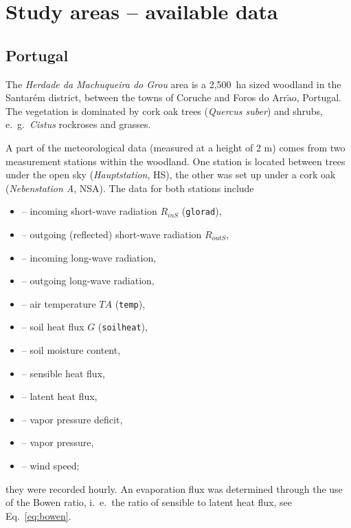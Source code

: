 \documentclass{scrreprt}
\newenvironment{denseitem}{
  \begin{itemize}
    \setlength{\itemsep}{0pt}
    \setlength{\parskip}{0pt}
    \setlength{\parsep}{0pt}
}{
  \end{itemize}
}
\begin{document}
\newpage
\section{Study areas -- available data} \label{sec:intro_areas}

\subsection{Portugal} \label{ssec:intro_areas_portugal}

The \emph{Herdade da Machuqueira do Grou} area is a 2,500~ha sized woodland in the Santar\'em district, between the towns of Coruche and Foros do Arr$\tilde{\text{a}}$o, Portugal.
The vegetation is dominated by cork oak trees (\emph{Quercus suber}) and shrubs, e.\ g.\ \emph{Cistus} rockroses and grasses.

A part of the meteorological data (measured at a height of 2 m) comes from two measurement stations within the woodland.
One station is located between trees under the open sky (\emph{Hauptstation}, HS), the other was set up under a cork oak (\emph{Nebenstation A}, NSA).
The data for both stations include
\begin{denseitem}
  \item[--] incoming short-wave radiation $R_{inS}$ (\verb!glorad!),
  \item[--] outgoing (reflected) short-wave radiation $R_{outS}$,
  \item[--] incoming long-wave radiation,
  \item[--] outgoing long-wave radiation,
  \item[--] air temperature $TA$ (\verb!temp!),
  \item[--] soil heat flux $G$ (\verb!soilheat!),
  \item[--] soil moisture content,
  \item[--] sensible heat flux,
  \item[--] latent heat flux,
  \item[--] vapor pressure deficit,
  \item[--] vapor pressure,
  \item[--] wind speed;
\end{denseitem}
%
they were recorded hourly.
An evaporation flux was determined through the use of the Bowen ratio, i.\ e.\ the ratio of sensible to latent heat flux, see Eq.~\eqref{eq:bowen}.
\end{document}
